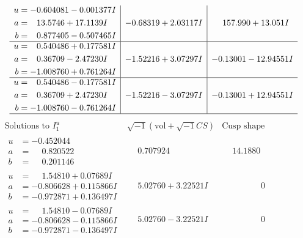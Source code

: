 \documentclass[1p]{elsarticle_modified}
\theoremstyle{definition}
\newcommand{\I}{\sqrt{-1}}
\begin{document}
$$\begin{array}{c|c|c}
\begin{aligned}
u &= -0.604081 - 0.001377 I \\
a &= \phantom{-}13.5746 + 17.1139 I \\
b &= \phantom{-}0.877405 - 0.507465 I\end{aligned}
 & -0.68319 + 2.03117 I & \phantom{-}157.990 + 13.051 I \\ \hline\begin{aligned}
u &= \phantom{-}0.540486 + 0.177581 I \\
a &= \phantom{-}0.36709 - 2.47230 I \\
b &= -1.008760 + 0.761264 I\end{aligned}
 & -1.52216 + 3.07297 I & -0.13001 - 12.94551 I \\ \hline\begin{aligned}
u &= \phantom{-}0.540486 - 0.177581 I \\
a &= \phantom{-}0.36709 + 2.47230 I \\
b &= -1.008760 - 0.761264 I\end{aligned}
 & -1.52216 - 3.07297 I & -0.13001 + 12.94551 I\\
 \hline 
 \end{array}$$\newpage$$\begin{array}{c|c|c}  
\text{Solutions to }I^u_{1}& \I (\text{vol} + \sqrt{-1}CS) & \text{Cusp shape}\\
 \hline 
\begin{aligned}
u &= -0.452044\phantom{ +0.000000I} \\
a &= \phantom{-}0.820522\phantom{ +0.000000I} \\
b &= \phantom{-}0.201146\phantom{ +0.000000I}\end{aligned}
 & \phantom{-}0.707924\phantom{ +0.000000I} & \phantom{-}14.1880\phantom{ +0.000000I} \\ \hline\begin{aligned}
u &= \phantom{-}1.54810 + 0.07689 I \\
a &= -0.806628 + 0.115866 I \\
b &= -0.972871 + 0.136497 I\end{aligned}
 & \phantom{-}5.02760 + 3.22521 I & \phantom{-0.000000 } 0 \\ \hline\begin{aligned}
u &= \phantom{-}1.54810 - 0.07689 I \\
a &= -0.806628 - 0.115866 I \\
b &= -0.972871 - 0.136497 I\end{aligned}
 & \phantom{-}5.02760 - 3.22521 I & \phantom{-0.000000 } 0 \\ \hline\begin{aligned}

\end{aligned}
\end{array}$$
\end{document}
